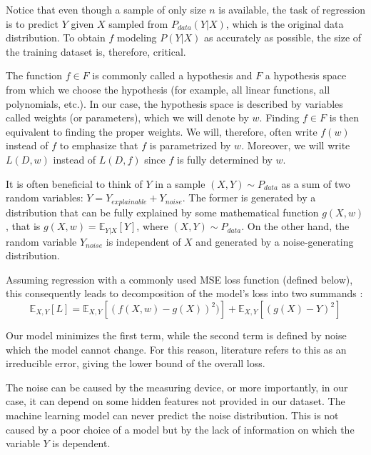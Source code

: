 Notice that even though a sample of only size $n$ is available, the task of regression is to predict $Y$ given $X$ sampled from $P_{data}(Y|X)$, which is the original data distribution. To obtain $f$ modeling $P(Y|X)$ as accurately as possible, the size of the training dataset is, therefore, critical.

\begin{defn}\label{def01:4}
The function $f \in F$ is commonly called a hypothesis and $F$ a hypothesis space from which we choose the hypothesis (for example, all linear functions, all polynomials, etc.). In our case, the hypothesis space is described by variables called weights (or parameters), which we will denote by $w$. Finding $f \in F$ is then equivalent to finding the proper weights. We will, therefore, often write $f(w)$ instead of $f$ to emphasize that $f$ is parametrized by $w$. Moreover, we will write $L(D, w)$ instead of $L(D, f)$ since $f$ is fully determined by $w$.
\end{defn}

It is often beneficial to think of $Y$ in a sample $(X, Y) \sim P_{data}$ as a sum of two random variables: $Y = Y_{explainable} + Y_{noise}$. The former is generated by a distribution that can be fully explained by some mathematical function $g(X, w)$, that is $g(X, w) = \mathbb{E}_{Y|X}[Y]$, where $(X, Y) \sim P_{data}$. On the other hand, the random variable $Y_{noise}$ is independent of $X$ and generated by a noise-generating distribution. 

Assuming regression with a commonly used MSE loss function (defined below), this consequently leads to decomposition of the model’s loss into two summands \citep{bishop2006pattern}:
\begin{equation}
\mathbb{E}_{X, Y}[L] = 
\mathbb{E}_{X, Y}[(f(X, w) - g(X))^2)] + 
\mathbb{E}_{X, Y}[(g(X) - Y)^2]
\end{equation}

Our model minimizes the first term, while the second term is defined by noise which the model cannot change. For this reason, literature refers to this as an irreducible error, giving the lower bound of the overall loss.

The noise can be caused by the measuring device, or more importantly, in our case, it can depend on some hidden features not provided in our dataset. The machine learning model can never predict the noise distribution. This is not caused by a poor choice of a model but by the lack of information on which the variable $Y$ is dependent.

